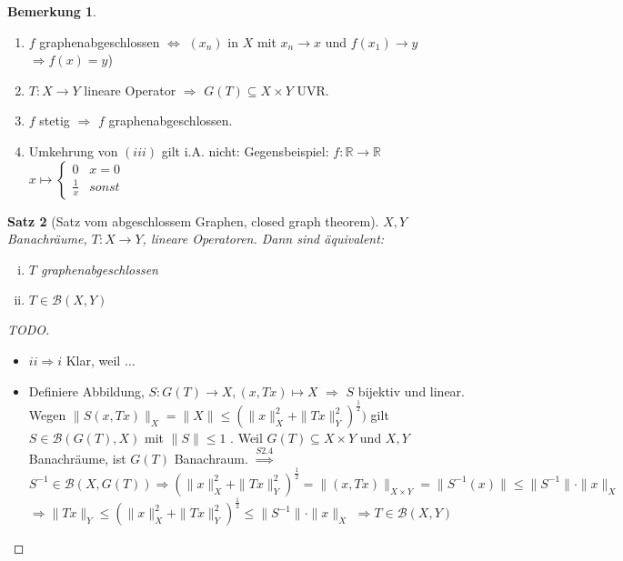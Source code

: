\documentclass[ngerman]{report}
\theoremstyle{plain}%
\newtheorem{thm}{Satz}[chapter]
\theoremstyle{definition}%
\theoremstyle{myStyle}
\newtheorem{bem}[thm]{Bemerkung}
\newcommand{\R}{\mathbb{R}}
\newcommand{\B}{\mathcal{B}} %
\newcommand{\BS}[1][X,Y]{\mathcal{B}(#1)} %
\newcommand{\norm}[1]{\|#1\|}
\newcommand{\df}[1][]{%
	\overset{#1}{\Rightarrow}
}
\newcommand{\aq}{\Leftrightarrow} %
\newcommand{\inv}[1]{#1^{-1}}
\newcommand{\qmarks}[1]{#1}
\begin{document}
	\begin{bem}
		\begin{enumerate}
			\item $f$ graphenabgeschlossen $\aq$ $(x_n)$ in $X$ mit $x_n \to x$ und $f(x_1) \to y$ 
			$\df f(x) = y$)
			\item $T: X\to Y$ lineare Operator $\df$ $G(T) \subseteq X\times Y$ UVR.
			\item $f$ stetig $\df$ $f$ graphenabgeschlossen.
			\item Umkehrung von $(iii)$ gilt i.A. nicht: Gegensbeispiel: $f: \R \to \R$ 
				$x\mapsto \begin{cases} 0& x=0\\ \frac{1}{x} & sonst \end{cases}$
		\end{enumerate}
	\end{bem}

	\begin{thm}[Satz vom abgeschlossem Graphen, closed graph theorem]
		$X,Y$ Banachräume, $T: X\to Y$, lineare Operatoren. Dann sind äquivalent:
			\begin{enumerate}[(i)]
				\item $T$ graphenabgeschlossen
				\item $T\in \BS$
			\end{enumerate}
	\end{thm}

	\begin{proof}[TODO]
		\begin{itemize}
			\item \qmarks{$ii\df i$} Klar, weil $\dots$ 
			\item Definiere Abbildung, $S: G(T) \to X, (x,Tx) \mapsto X$
			$\df$ $S$ bijektiv und linear. Wegen 
				$\norm{S(x,Tx)}_X = \norm{X} \leq (\norm{x}_X^2 + \norm{Tx}_Y^2)^{\frac{1}{2}})$
				gilt $S\in \B(G(T),X)$ mit $\norm{S} \leq 1$ .
				Weil $G(T) \subseteq X\times Y$ und $X,Y$ Banachräume, ist $G(T)$ Banachraum.
				$\df[S2.4]$ $\inv{S} \in \B(X, G(T)) \df (\norm{x}_X^2 + \norm{Tx}_Y^2)^{\frac{1}{2}} = \norm{(x,Tx)}_{X\times Y} = \norm{\inv{S}(x)} \leq \norm{\inv{S}} \cdot \norm{x}_X$
				$\df \norm{Tx}_Y \leq (\norm{x}_X^2 + \norm{Tx}_Y^2)^{\frac{1}{2}} \leq \norm{\inv{S}}\cdot\norm{x}_X$
				$\df T\in\BS$
		\end{itemize}
	\end{proof}
\end{document}
